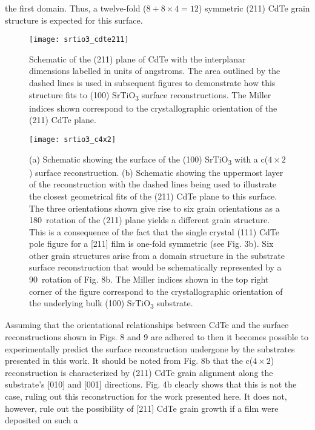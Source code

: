 the first domain. Thus, a twelve-fold ($8 + 8 \times 4 = 12$) symmetric
(211) CdTe grain structure is expected for this surface.
\begin{figure}
    \centering
    \texttt{[image: srtio3\_cdte211]}
    \caption[Projection of (211) CdTe unit cell on SrTiO\textsubscript{3} surface]{\label{fig:srtio3_cdte211}Schematic of the (211) plane of CdTe with the interplanar dimensions
        labelled in units of angstroms. The area outlined by the dashed lines is used in
        subsequent figures to demonstrate how this structure fits to (100) SrTiO\textsubscript{3} surface
        reconstructions. The Miller indices shown correspond to the crystallographic
        orientation of the (211) CdTe plane.}
\end{figure}
\begin{figure}
    \centering
    \texttt{[image: srtio3\_c4x2]}
    \caption[CdTe on c(4$\times$2) SrTiO\textsubscript{3} surface]{\label{fig:srtio3_c4x2}(a) Schematic showing the surface of the (100) SrTiO\textsubscript{3} with a c($4\times2$) surface reconstruction. (b) Schematic showing the uppermost layer of the reconstruction with the dashed lines being used to illustrate the closest geometrical fits of the (211) CdTe plane to this surface. The three orientations shown give rise to six grain orientations as a 180\degree~rotation of the (211) plane yields a different grain structure. This is a consequence of the fact that the single crystal (111) CdTe pole figure for a [211] film is one-fold symmetric (see Fig. 3b). Six other grain structures arise from a domain structure in the substrate surface reconstruction that would be schematically represented by a 90\degree~rotation of Fig. 8b. The Miller indices shown in the top right corner of the figure correspond to the crystallographic orientation of the underlying bulk (100) SrTiO\textsubscript{3} substrate.}
\end{figure}
Assuming that the orientational relationships between CdTe
and the surface reconstructions shown in Figs. 8 and 9 are adhered
to then it becomes possible to experimentally predict the surface
reconstruction undergone by the substrates presented in this
work. It should be noted from Fig. 8b that the c($4\times2$)
reconstruction is characterized by (211) CdTe grain alignment
along the substrate’s [010] and [001] directions. Fig. 4b clearly
shows that this is not the case, ruling out this reconstruction for the
work presented here. It does not, however, rule out the possibility
of [211] CdTe grain growth if a film were deposited on such a
